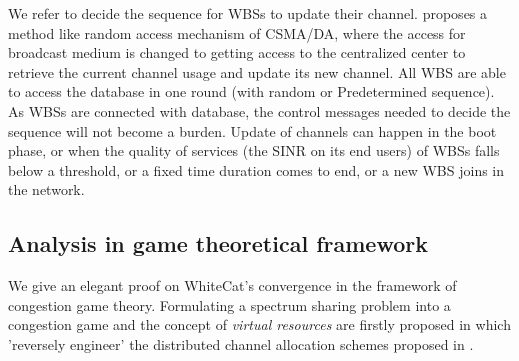 We refer \cite{CApotentialLearning_05dyspan} to decide the sequence for WBSs to update their channel. \cite{CApotentialLearning_05dyspan} proposes a method like random access mechanism of CSMA/DA, where the access for broadcast medium is changed to getting access to the centralized center to retrieve the current channel usage and update its new channel. All WBS are able to access the database in one round (with random or Predetermined sequence). As WBSs are connected with database, the control messages needed to decide the sequence will not become a burden. Update of channels can happen in the boot phase, or when the quality of services (the SINR on its end users) of WBSs falls below a threshold, or a fixed time duration comes to end, or a new WBS joins in the network. 


\subsection{Analysis in game theoretical framework}
\label{game}
We give an elegant proof on WhiteCat's convergence in the framework of congestion game theory. Formulating a spectrum sharing problem into a congestion game and the concept of \textit{virtual resources} are firstly proposed in \cite{allerton08_liu} which 'reversely engineer' the distributed channel allocation schemes proposed in \cite{Babadi08, Ko_DistributedCA}.

